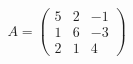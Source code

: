 \documentclass[preview]{standalone}
\begin{document}
\begin{align*}
A = \begin{pmatrix}5 & 2 & -1 \\1 & 6 & -3 \\2 & 1 & 4\end{pmatrix}
\end{align*}
\end{document}
